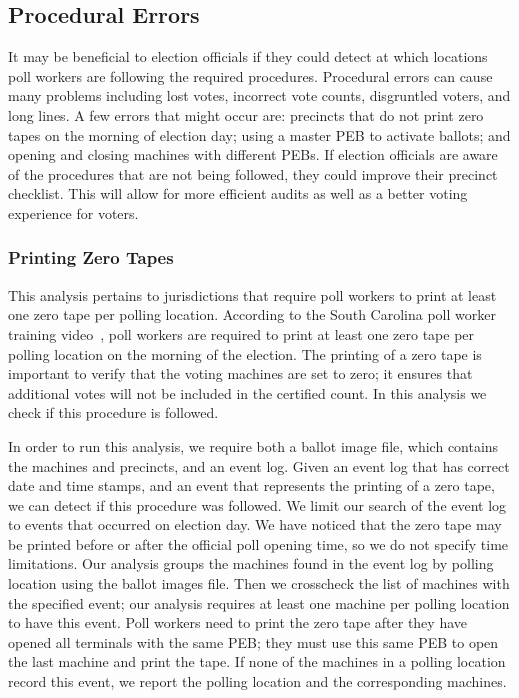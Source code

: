 \subsection{Procedural Errors}
It may be beneficial to election officials if they could detect at which locations poll workers are following the required procedures. Procedural errors can cause many problems including lost votes, incorrect vote counts, disgruntled voters, and long lines. A few errors that might occur are: precincts that do not print zero tapes on the morning of election day; using a master PEB to activate ballots; and opening and closing machines with different PEBs. If election officials are aware of the procedures that are not being followed, they could improve their precinct checklist. This will allow for more efficient audits as well as a better voting experience for voters.

\subsubsection{Printing Zero Tapes}
This analysis pertains to jurisdictions that require poll workers to
print at least one zero tape per polling location.  According to the
South Carolina poll worker training video~\cite{VotingInfo}, poll
workers are required to print at least one zero tape per polling
location on the morning of the election. The printing of a zero tape
is important to verify that the voting machines are set to zero; it
ensures that additional votes will not be included in the certified
count. In this analysis we check if this procedure is followed.

In order to run this analysis, we require both a ballot image file, which contains the machines and precincts, and an event log.  Given an event log that has correct date and time stamps, and an event that represents the printing of a zero tape, we can detect if this procedure was followed.  We limit our search of the event log to events that occurred on election day.  We have noticed that the zero tape may be printed before or after the official poll opening time, so we do not specify time limitations.  Our analysis groups the machines found in the event log by polling location using the ballot images file.  Then we crosscheck the list of machines with the specified event; our analysis requires at least one machine per polling location to have this event.  Poll workers need to print the zero tape after they have opened all terminals with the same PEB; they must use this same PEB to open the last machine and print the tape.  If none of the machines in a polling location record this event, we report the polling location and the corresponding machines.

